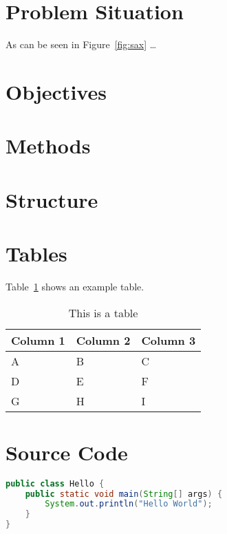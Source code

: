 \section{Problem Situation}

\blindtext


As can be seen in Figure~\ref{fig:sax} \ldots

\section{Objectives}

\blindtext

\section{Methods}

\blindtext

\section{Structure}

\blindtext

\section{Tables}

Table~\ref{tab:table-one} shows an example table.

\begin{table}[htbp]
    \centering
    \caption{This is a table}
    \label{tab:table-one}
    \begin{tabular}{lll}
        \addlinespace
        \toprule
        Column 1 & Column 2 & Column 3 \\
        \midrule
        A     & B     & C \\
        D     & E     & F \\
        G     & H     & I \\
        \bottomrule
    \end{tabular}
\end{table}

\section{Source Code}

\begin{lstlisting}[language=Java, caption=Hello World in Java, label=lst:hello-world-java]
public class Hello {
    public static void main(String[] args) {
        System.out.println("Hello World");
    }
}
\end{lstlisting}


